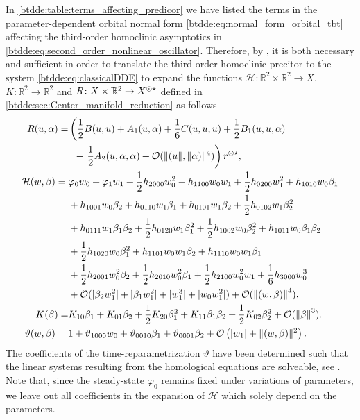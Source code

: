 In \cref{btdde:table:terms_affecting_predicor} we have listed the terms in the
parameter-dependent orbital normal form
\cref{btdde:eq:normal_form_orbital_tbt} affecting the third-order homoclinic
asymptotics in \cref{btdde:eq:second_order_nonlinear_oscillator}. Therefore, by
\cite[Theorem 1]{Bosschaert@Interplay}, it is both necessary and sufficient in
order to translate the third-order homoclinic precitor to the system
\cref{btdde:eq:classicalDDE} to expand the functions $\mathcal{H} \colon \mathbb R^2
\times \mathbb R^2 \rightarrow X$, $K \colon \mathbb R^2 \rightarrow \mathbb
R^2$ and $R \colon X \times \mathbb R^2 \rightarrow X^{\odot\star}$ defined in
\cref{btdde:sec:Center_manifold_reduction} as follows
%
\begin{align}
R(u,\alpha) =& \label{btdde:eq:R_expansion_TBT}
    \left(\frac{1}{2} B(u,u) + A_1(u,\alpha) + \frac{1}{6} C(u,u,u) + \frac{1}{2} B_1(u,u,\alpha) \right. \\
    &\phantom{\Bigl(}+ \left. \frac{1}{2} A_2(u,\alpha,\alpha) 
    + \mathcal O(\|(u\|,\|\alpha)\|^4) \right) r^{\odot\star} , \nonumber \\
        \mathcal H(w,\beta) = {}& \label{btdde:eq:h_expansion-TBT}
        \varphi_0 w_0 + \varphi_1 w_1 + \frac{1}{2}h_{2000}w_0^2 + h_{1100}w_0w_1 + \frac{1}{2}h_{0200}w_1^2 + h_{1010}w_0\beta_1 \\
    & +h_{1001}w_0\beta_2 + h_{0110}w_1\beta_1 + h_{0101}w_1\beta_2 + \frac{1}{2}h_{0102}w_1\beta_2^2 \nonumber \\
    & +h_{0111}w_1\beta_1\beta_2 + \frac{1}{2}h_{0120}w_1\beta_1^2 + \frac{1}{2}h_{1002}w_0\beta_2^2 + h_{1011}w_0\beta_1\beta_2 \nonumber \\
    & +\frac{1}{2}h_{1020}w_0\beta_1^2 + h_{1101}w_0w_1\beta_2 + h_{1110}w_0w_1\beta_1\nonumber \\
    & +\frac{1}{2}h_{2001}w_0^2\beta_2 + \frac{1}{2}h_{2010}w_0^2\beta_1 + \frac{1}{2}h_{2100}w_0^2w_1 + \frac{1}{6}h_{3000}w_0^3 \nonumber \\
    & +\mathcal{O}(|\beta_2w_1^2| + |\beta_1w_1^2| + |w_1^3| + |w_0w_1^2|) + \mathcal{O}(\left\Vert (w,\beta)\right\Vert ^4), \nonumber\\
K(\beta) =& K_{10}\beta_1 + K_{01}\beta_2 + 
            \frac{1}{2}K_{20}\beta_1^2 + K_{11}\beta_1\beta_2 + \frac{1}{2}K_{02}\beta_2^2
             +\mathcal{O}(\left\Vert \beta\right\Vert ^3).\label{btdde:eq:K_expansion_TBT} \\
\vartheta(w,\beta) = {}& \label{btdde:eq:theta_expansion_TBT}
        1 + \vartheta_{1000}w_0 + \vartheta_{0010} \beta_1 + \vartheta_{0001} \beta_2 
        + \mathcal O\left(|w_1| + \|(w,\beta)\|^2\right).
\end{align}
The coefficients of the time-reparametrization $\vartheta$ have been determined
such that the linear systems resulting from the homological equations are
solveable, see \cite[Remark 2.3]{Bosschaert@Interplay}. Note that, since the
steady-state $\varphi_0$ remains fixed under variations of parameters, we leave
out all coefficients in the expansion of $\mathcal{H}$ which solely depend on
the parameters.

